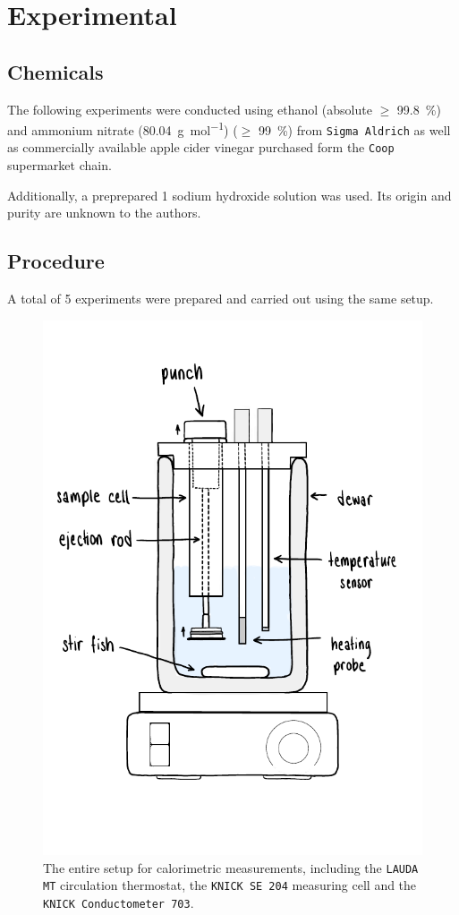 \section{Experimental}



\subsection{Chemicals}
The following experiments were conducted using ethanol (absolute $\geq$ \qty{99.8}{\percent}) and  ammonium nitrate (\qty{80.04}{\gram\per\mole}) ($\geq$ \qty{99}{\percent}) from \texttt{Sigma Aldrich} as well as commercially available apple cider vinegar purchased form the \texttt{Coop} supermarket chain. 

Additionally, a preprepared \qty{1}{\M} sodium hydroxide solution was used. Its origin and purity are unknown to the authors.

\subsection{Procedure}

A total of 5 experiments were prepared and carried out using the same setup.


\begin{figure}[H]
    \centering
    \includegraphics[width=.5\textwidth]{figures/Calorimeter.pdf}
    \caption{The entire setup for calorimetric measurements, including the \texttt{LAUDA MT} circulation thermostat, the \texttt{KNICK SE 204} measuring cell and the \texttt{KNICK Conductometer 703}.}
    \label{fig:sketch_calorimeter}
\end{figure}


